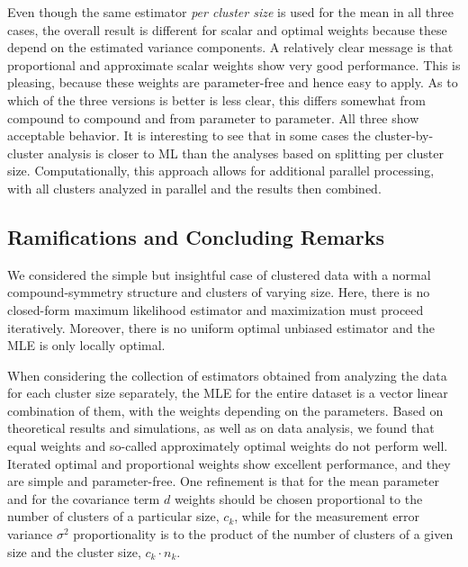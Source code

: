 \documentclass[11pt,a5paper,twoside]{book}
\begin{document}
Even though the same estimator {\em per cluster size\/} is used for 
the mean in all three cases, the overall result is different for scalar 
and optimal weights because these depend on the estimated variance 
components. A relatively clear message is that proportional and approximate 
scalar weights show very good performance. This is pleasing, because these 
weights are parameter-free and hence easy to apply. As to which of the three 
versions is better is less clear, this differs somewhat from compound to 
compound and from parameter to parameter. All three show 
acceptable behavior. It is interesting to see that in some cases the 
cluster-by-cluster analysis is closer to ML than the analyses based 
on splitting per cluster size. Computationally, this approach allows 
for additional parallel processing, with all clusters analyzed in parallel 
and the results then combined.


\subsection{Ramifications and Concluding Remarks}
\label{ramifications}

We considered the simple but insightful case of clustered data 
with a normal compound-symmetry structure and clusters of varying size. 
Here, there is no closed-form maximum 
likelihood estimator and maximization must proceed iteratively. Moreover, there is no uniform optimal unbiased estimator and the MLE is only locally optimal. 

When considering the collection of estimators 
obtained from analyzing the data for each cluster size separately, 
the MLE for the entire dataset is a vector linear combination of them, 
with the weights depending on the parameters.  Based 
on theoretical results and simulations, as well as on data analysis, 
we found that equal weights and so-called approximately optimal weights do 
not perform well. Iterated optimal and proportional weights show excellent 
performance, and they are simple and parameter-free. One refinement is 
that for the mean parameter and for the covariance term $d$ weights should 
be chosen proportional to the number of clusters of a particular size, 
$c_k$, while for the measurement error variance $\sigma^2$ proportionality 
is to the product of the number of clusters of a given size and the cluster 
size, $c_k\cdot n_k$.
\end{document}
